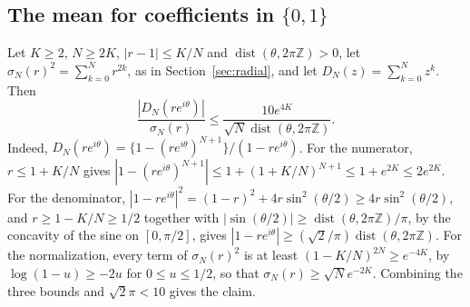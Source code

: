 \subsection{The mean for coefficients in \texorpdfstring{$\{0,1\}$}{\{0,1\}}}
\begin{remark}\label{rem:mean-newman}
Let $K\ge2$, $N\ge2K$, $|r-1|\le K/N$ and
$\operatorname{dist}(\theta,2\pi\mathbb Z)>0$, let
$\sigma_N(r)^2=\sum_{k=0}^Nr^{2k}$, as in Section~\ref{sec:radial}, and let
$D_N(z)=\sum_{k=0}^Nz^k$. Then
\[
 \frac{|D_N(re^{i\theta})|}{\sigma_N(r)}
 \le\frac{10e^{4K}}{\sqrt N\operatorname{dist}(\theta,2\pi\mathbb Z)}.
\]
Indeed, $D_N(re^{i\theta})=\{1-(re^{i\theta})^{N+1}\}/(1-re^{i\theta})$.
For the numerator, $r\le1+K/N$ gives
$|1-(re^{i\theta})^{N+1}|\le1+(1+K/N)^{N+1}\le1+e^{2K}\le2e^{2K}$.
For the denominator,
$|1-re^{i\theta}|^2=(1-r)^2+4r\sin^2(\theta/2)\ge4r\sin^2(\theta/2)$,
and $r\ge1-K/N\ge1/2$ together with
$|\sin(\theta/2)|\ge\operatorname{dist}(\theta,2\pi\mathbb Z)/\pi$, by the
concavity of the sine on $[0,\pi/2]$, gives
$|1-re^{i\theta}|\ge(\sqrt2/\pi)\operatorname{dist}(\theta,2\pi\mathbb Z)$.
For the normalization, every term of $\sigma_N(r)^2$ is at least $(1-K/N)^{2N}\ge e^{-4K}$, by $\log(1-u)\ge-2u$ for
$0\le u\le1/2$, so that $\sigma_N(r)\ge\sqrt Ne^{-2K}$.
Combining the three bounds and $\sqrt2\pi<10$ gives the claim.
\end{remark}
